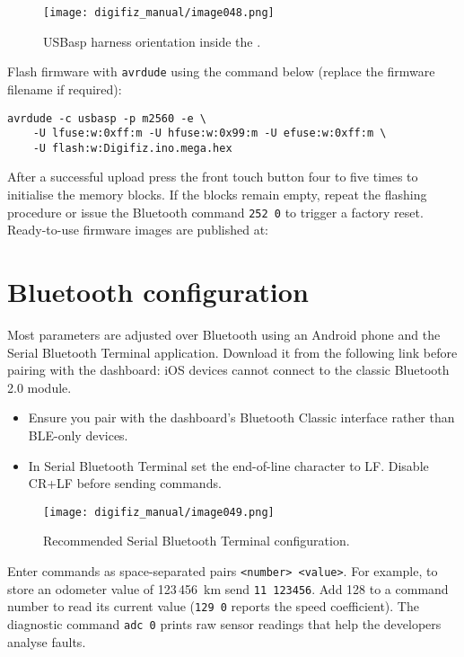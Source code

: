 \begin{figure}[htbp]
    \centering
    \texttt{[image: digifiz\_manual/image048.png]}
    \caption{USBasp harness orientation inside the \ReplicaGenOne{}.}
    \label{fig:usbasp-cable}
\end{figure}

Flash firmware with \texttt{avrdude} using the command below (replace the firmware filename if required):

\begin{verbatim}
avrdude -c usbasp -p m2560 -e \
    -U lfuse:w:0xff:m -U hfuse:w:0x99:m -U efuse:w:0xff:m \
    -U flash:w:Digifiz.ino.mega.hex
\end{verbatim}

After a successful upload press the front touch button four to five times to initialise the memory blocks. If the blocks remain empty, repeat the flashing procedure or issue the Bluetooth command \verb|252 0| to trigger a factory reset. Ready-to-use firmware images are published at:

\section{Bluetooth configuration}
Most parameters are adjusted over Bluetooth using an Android phone and the Serial Bluetooth Terminal application. Download it from the following link before pairing with the dashboard:
iOS devices cannot connect to the classic Bluetooth 2.0 module.

\begin{itemize}
    \item Ensure you pair with the dashboard's Bluetooth Classic interface rather than BLE-only devices.
    \item In Serial Bluetooth Terminal set the end-of-line character to LF. Disable CR+LF before sending commands.
\end{itemize}

\begin{figure}[htbp]
    \centering
    \texttt{[image: digifiz\_manual/image049.png]}
    \caption{Recommended Serial Bluetooth Terminal configuration.}
    \label{fig:sbt-settings}
\end{figure}

Enter commands as space-separated pairs \verb|<number> <value>|. For example, to store an odometer value of 123\,456~km send \verb|11 123456|. Add 128 to a command number to read its current value (\verb|129 0| reports the speed coefficient). The diagnostic command \verb|adc 0| prints raw sensor readings that help the developers analyse faults.

